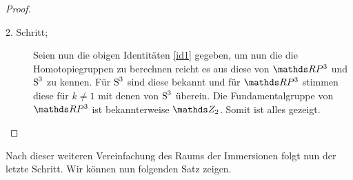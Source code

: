 \begin{Lem}
\begin{proof}
\begin{description}
                \item[2. Schritt;] Seien nun die obigen Identitäten
                  \cref{id1} gegeben, um nun die
                  die Homotopiegruppen zu berechnen reicht es aus
                  diese von $\RP^3$ und $ \S^3 $ zu kennen. Für
                  $ \S^3 $ sind diese bekannt und für $ \RP^3 $
                  stimmen diese für $ k \neq 1 $ mit denen von
                  $ \S^3 $ überein. Die Fundamentalgruppe von
                  $ \RP^3 $ ist bekannterweise $ \Z_2 $. Somit ist
                  alles gezeigt.
		\end{description}
		
		
		
	\end{proof}
	
\end{Lem}

Nach dieser weiteren Vereinfachung des Raums der Immersionen folgt nun
der letzte Schritt. Wir können nun folgenden Satz zeigen.



